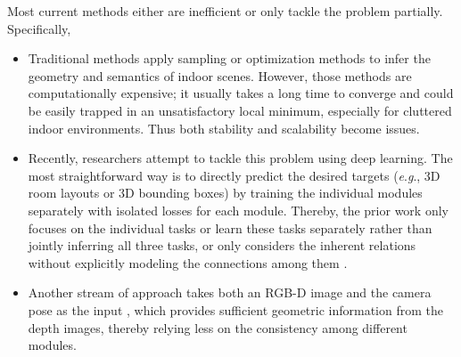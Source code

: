 \documentclass{article}
\makeatletter
\newcommand{\eg}{\textit{e}.\textit{g}.\@\xspace}
\makeatother
\begin{document}
Most current methods either are inefficient or only tackle the problem partially. Specifically,
\begin{itemize}[leftmargin=*,noitemsep,nolistsep]
    \item Traditional methods \citep{gupta2010estimating,zhao2011image,zhao2013scene,choi2013understanding,schwing2013box,zhang2014panocontext,izadinia2016im2cad,huang2018holistic} apply sampling or optimization methods to infer the geometry and semantics of indoor scenes. However, those methods are computationally expensive; it usually takes a long time to converge and could be easily trapped in an unsatisfactory local minimum, especially for cluttered indoor environments. Thus both stability and scalability become issues.
    \item Recently, researchers attempt to tackle this problem using deep learning. The most straightforward way is to directly predict the desired targets (\eg, 3D room layouts or 3D bounding boxes) by training the individual modules separately with isolated losses for each module. Thereby, the prior work \citep{mousavian20173d,lee2017roomnet,kehl2017ssd,kundu20183d,zou2018layoutnet,liu2018planenet} only focuses on the individual tasks or learn these tasks separately rather than jointly inferring all three tasks, or only considers the inherent relations without explicitly modeling the connections among them \citep{tulsiani2017factoring}.  
    \item Another stream of approach takes both an RGB-D image and the camera pose as the input \citep{lin2013holistic,song2014sliding,song2016deep,song2017semantic,deng2017amodal,zou2017complete,qi2017frustum,lahoud20172d,zhang2016deepcontext}, which provides sufficient geometric information from the depth images, thereby relying less on the consistency among different modules.
\end{itemize}
\end{document}
